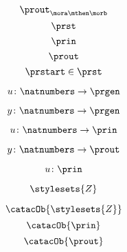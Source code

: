 {\begin{forslides}
        \begin{equation}
            \label{eq:morab-prout}
            \prout_{\mora\mthen\morb}
        \end{equation}
        \begin{equation}
            \label{eq:gen-prst}
            \prst
        \end{equation}
        \begin{equation}
            \label{eq:gen-prin}
            \prin
        \end{equation}
        \begin{equation}
            \label{eq:gen-prout}
            \prout
        \end{equation}
        \begin{equation}
            \label{eq:moore-start}
            \prstart \in \prst
        \end{equation}

        \begin{equation}
            \label{eq:prgen-u}
            u\colon \natnumbers \to \prgen
        \end{equation}

        \begin{equation}
            \label{eq:prgen-y}
            y\colon \natnumbers \to \prgen
        \end{equation}


        \begin{equation}
            \label{eq:prgen-u-1}
            u\colon \natnumbers \to \prin
        \end{equation}

        \begin{equation}
            \label{eq:prgen-y-1}
            y\colon \natnumbers \to \prout
        \end{equation}

        \begin{equation}
            \label{eq:prgen-u-2}
            u\colon \prin
        \end{equation}



        \begin{equation}
            \label{eq:Z}
            \stylesets{Z}
        \end{equation}


        \begin{equation}
            \label{eq:Za}
            \catacOb{\stylesets{Z}}
        \end{equation}
        \begin{equation}
            \label{eq:Ua}
            \catacOb{\prin}
        \end{equation}
        \begin{equation}
            \label{eq:Ya}
            \catacOb{\prout}
        \end{equation}




\end{forslides}}
